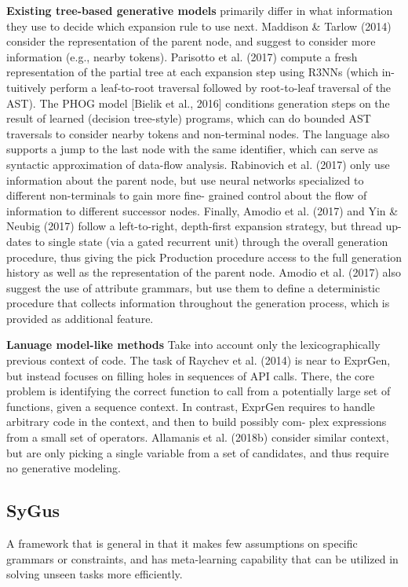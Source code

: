 \documentclass{article}
\begin{document}
\textbf{Existing tree-based generative models}
primarily differ in what information they use to decide which expansion rule to use next. Maddison & Tarlow (2014) consider the representation of the  parent node, and suggest to consider more information (e.g., nearby tokens). Parisotto et al. (2017) compute a fresh representation of the partial tree at each expansion step using R3NNs (which in- tuitively perform a leaf-to-root traversal followed by root-to-leaf traversal of the AST). The PHOG model [Bielik et al., 2016] conditions generation steps on the result of learned (decision tree-style) programs, which can do bounded AST traversals to consider nearby tokens and non-terminal nodes. The language also supports a jump to the last node with the same identifier, which can serve as syntactic approximation of data-flow analysis. Rabinovich et al. (2017) only use information about the parent node, but use neural networks specialized to different non-terminals to gain more fine- grained control about the flow of information to different successor nodes. Finally, Amodio et al. (2017) and Yin & Neubig (2017) follow a left-to-right, depth-first expansion strategy, but thread up- dates to single state (via a gated recurrent unit) through the overall generation procedure, thus giving the pick Production procedure access to the full generation history as well as the representation of the parent node. Amodio et al. (2017) also suggest the use of attribute grammars, but use them to define a deterministic procedure that collects information throughout the generation process, which is provided as additional feature.

\textbf{Lanuage model-like methods} 
Take into account only the lexicographically previous context of code. The task of Raychev et al. (2014) is near to ExprGen, but instead focuses on filling holes in sequences of API calls. There, the core problem is identifying the correct function to call from a potentially large set of functions, given a sequence context. In contrast, ExprGen requires to handle arbitrary code in the context, and then to build possibly com- plex expressions from a small set of operators. Allamanis et al. (2018b) consider similar context, but are only picking a single variable from a set of candidates, and thus require no generative modeling.
\subsection{SyGus}
 A framework that is general in that it makes few assumptions on specific grammars or constraints, and has meta-learning capability that can be utilized in solving unseen tasks more efficiently.
\end{document}
